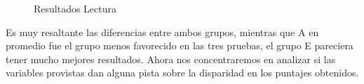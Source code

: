 \documentclass{article}
\begin{document}
    \vspace*{-9mm}
    \begin{figure}[H]
        \noindent{}
        \vspace*{-20mm}
        \caption{Resultados Lectura}
        \label{fig:minipage1}
    \end{figure}
     
    Es muy resaltante las diferencias entre ambos grupos, mientras que A en promedio fue el grupo menos favorecido en las
    tres pruebas, el grupo E pareciera tener mucho mejores resultados. Ahora nos concentraremos en analizar si las variables
    provistas dan alguna pista sobre la disparidad en los puntajes obtenidos.

   
\end{document}
